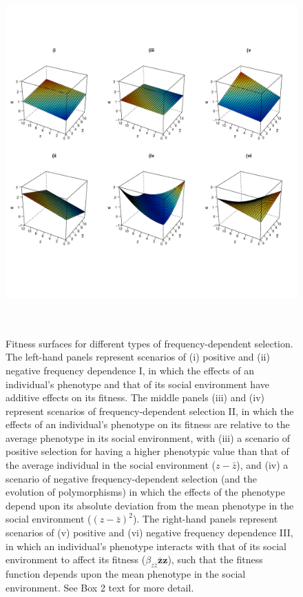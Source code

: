 \documentclass{article}
\begin{document}
\begin{figure}[H] 
	\centering
	\includegraphics[width=14cm, height=14cm]{Figures/Box2.pdf}
	\caption{Fitness surfaces for different types of frequency-dependent selection. The left-hand panels represent scenarios of (i) positive and (ii) negative frequency dependence I, in which the effects of an individual's phenotype and that of its social environment have additive effects on its fitness. The middle panels (iii) and (iv) represent scenarios of frequency-dependent selection II, in which the effects of an individual's phenotype on its fitness are relative to the average phenotype in its social environment, with (iii) a scenario of positive selection for having a higher phenotypic value than that of the average individual in the social environment ($z-\bar{z}$), and (iv) a scenario of negative frequency-dependent selection (and the evolution of polymorphisms) in which the effects of the phenotype depend upon its absolute deviation from the mean phenotype in the social environment ($(z-\bar{z})^2$). The right-hand panels represent scenarios of (v) positive and (vi) negative frequency dependence III, in which an individual's phenotype interacts with that of its social environment to affect its fitness ($\beta_{z\bar{z}} \mathbf{\bar{z}z}$), such that the fitness function depends upon the mean phenotype in the social environment. See Box 2 text for more detail.}
	\label{fig:Box2}
\end{figure}
\end{document}
